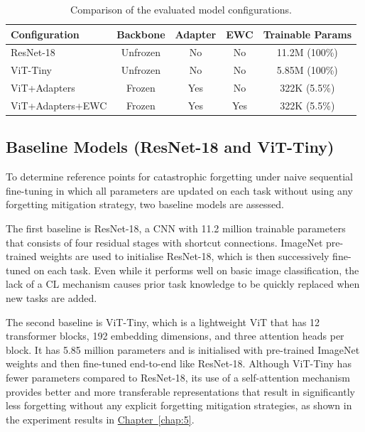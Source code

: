 \documentclass[english, LaM, oneside]{sapthesis}%
\numberwithin{equation}{chapter}
\begin{document}
\begin{table}[h]
\centering
\caption{Comparison of the evaluated model configurations.}
\label{tab:4.2}
\small
\setlength{\tabcolsep}{9pt}
\renewcommand{\arraystretch}{1.5}
\begin{tabular}{lcccc}
\toprule
\textbf{Configuration} & \textbf{Backbone} & \textbf{Adapter} & \textbf{EWC} & \textbf{Trainable Params} \\
\midrule
ResNet-18        & Unfrozen & No  & No  & 11.2M (100\%) \\
ViT-Tiny         & Unfrozen & No  & No  & 5.85M (100\%) \\
ViT+Adapters     & Frozen   & Yes & No  & 322K (5.5\%) \\
ViT+Adapters+EWC & Frozen   & Yes & Yes & 322K (5.5\%) \\
\bottomrule
\end{tabular}
\end{table}


\subsection{Baseline Models (ResNet-18 and ViT-Tiny)}
To determine reference points for catastrophic forgetting under naive sequential fine-tuning in which all parameters are updated on each task without using any forgetting mitigation strategy, two baseline models are assessed.

The first baseline is ResNet-18, a CNN with 11.2 million trainable parameters that consists of four residual stages with shortcut connections. ImageNet pre-trained weights are used to initialise ResNet-18, which is then successively fine-tuned on each task. Even while it performs well on basic image classification, the lack of a CL mechanism causes prior task knowledge to be quickly replaced when new tasks are added.

The second baseline is ViT-Tiny, which is a lightweight ViT that has 12 transformer blocks, 192 embedding dimensions, and three attention heads per block. It has 5.85 million parameters and is initialised with pre-trained ImageNet weights and then fine-tuned end-to-end like ResNet-18. Although ViT-Tiny has fewer parameters compared to ResNet-18, its use of a self-attention mechanism provides better and more transferable representations that result in significantly less forgetting without any explicit forgetting mitigation strategies, as shown in the experiment results in \hyperref[chap:5]{Chapter~\ref*{chap:5}}.
\end{document}
